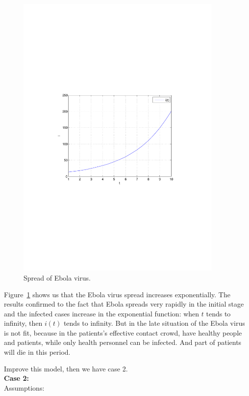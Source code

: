 \begin{figure}
\centering
\includegraphics[width=4in]{imgs/i(t).pdf}
\caption{Spread of Ebola virus.}
\label{fig:1}
\end{figure}
Figure~\ref{fig:1} shows us that the Ebola virus spread
increases exponentially. The results confirmed to the fact that
Ebola spreads very rapidly in the initial stage and the
infected cases increase in the exponential function: when $t$
tends to infinity, then $i(t)$ tends to infinity. But in the
late situation of the Ebola virus is not fit, because in the
patients's effective contact crowd, have healthy people and
patients, while only health personnel can be infected. And part
of patients will die in this period.
\par Improve this model, then we have case 2.\\
\textbf{Case 2:}\\
Assumptions:
